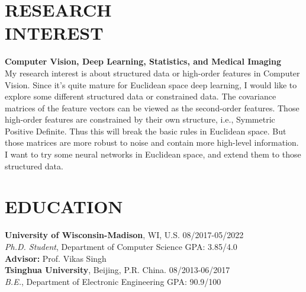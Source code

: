 \documentclass[margin]{res}
\begin{document}
\begin{resume}
\vspace{-2em}
\section{RESEARCH \\ INTEREST}
                \textbf{Computer Vision, Deep Learning, Statistics, and Medical Imaging}\\
                My research interest is about structured data or high-order features in Computer Vision. Since it's quite mature for Euclidean space deep learning, I would like to explore some different structured data or constrained data. The covariance matrices of the feature vectors can be viewed as the second-order features. Those high-order features are constrained by their own structure, i.e., Symmetric Positive Definite. Thus this will break the basic rules in Euclidean space. But those matrices are more robust to noise and contain more high-level information. I want to try some neural networks in Euclidean space, and extend them to those structured data.
                
\vspace{-1em}
\section{EDUCATION} 
                {\bf University of Wisconsin-Madison}, WI, U.S. \hfill 08/2017-05/2022\\
                {\sl {Ph.D. Student}}, Department of Computer Science \hfill GPA: 3.85/4.0\\
                {\bf Advisor:} Prof. Vikas Singh\\
                {\bf Tsinghua University}, Beijing, P.R. China. \hfill 08/2013-06/2017\\
                {\sl {B.E.}}, Department of Electronic Engineering \hfill GPA: 90.9/100

\vspace{-1em}                

\end{resume}
\end{document}
